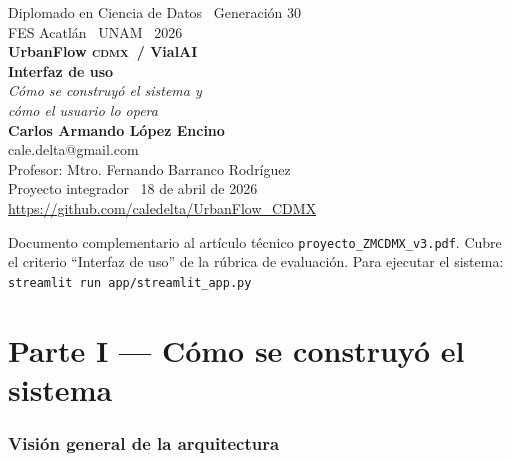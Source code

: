 \documentclass[11pt,a4paper]{article}
\newcommand{\VialAI}{\textbf{\textcolor{vialTeal}{Vial}\textcolor{vialAmber}{AI}}}
\newcommand{\CDMX}{\textsc{cdmx}}
\begin{document}
\begin{titlepage}
\centering
\vspace*{1.5cm}

{\color{vialMuted}\large Diplomado en Ciencia de Datos \textbullet\ Generación 30}\\[0.3em]
{\color{vialMuted}\small FES Acatlán \textbullet\ UNAM \textbullet\ 2026}\\[2cm]

{\color{vialTeal}\Huge\bfseries UrbanFlow \CDMX\ / \VialAI}\\[0.8em]
{\color{vialNavy}\LARGE\bfseries Interfaz de uso}\\[0.5em]
{\color{vialMuted}\large\itshape Cómo se construyó el sistema y\\
cómo el usuario lo opera}\\[2.5cm]

{\large\textbf{Carlos Armando López Encino}}\\
{\small\color{vialMuted}cale.delta@gmail.com}\\[0.6em]
{\small Profesor: Mtro. Fernando Barranco Rodríguez}\\[2cm]

{\color{vialMuted}\small Proyecto integrador \textbullet\ 18 de abril de 2026}\\[0.4em]
{\color{vialAqua}\small\url{https://github.com/caledelta/UrbanFlow_CDMX}}

\vfill
{\color{vialMuted}\footnotesize
Documento complementario al artículo técnico \texttt{proyecto\_ZMCDMX\_v3.pdf}.
Cubre el criterio ``Interfaz de uso'' de la rúbrica de evaluación.
Para ejecutar el sistema: \texttt{streamlit run app/streamlit\_app.py}}
\end{titlepage}

\newpage
\tableofcontents
\newpage


\part*{Parte I — Cómo se construyó el sistema}

\section{Visión general de la arquitectura}
\end{document}
